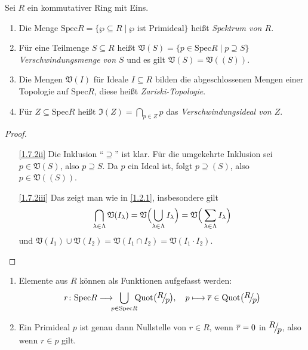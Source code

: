 \documentclass[a4paper,12pt]{scrbook}
\newtheorem{proof}{Beweis}
\def\V{\mathfrak{V}}
\def\I{\mathfrak{I}}
\newcommand{\Spec}{\mathrm{Spec}}
\newcommand{\ra}{\longrightarrow}
\newcommand{\Quot}{\mathrm{Quot}}
\renewcommand{\mapsto}{\longmapsto}
\def\Bar#1{\ensuremath\overline{#1}}
\newcommand{\Quotient}[2]{
  \raisebox{0.7ex}{\ensuremath{#1}}
  \ensuremath{\mkern-3mu}\big/\ensuremath{\mkern-3mu}
  \raisebox{-0.6ex}{\ensuremath{#2}}}
\begin{document}
\begin{db}\label{1.7.2}
  Sei $R$ ein kommutativer Ring mit Eins.
  \begin{enumerate}
  \item{} Die Menge $\Spec R = \{\wp\subseteq R \mid \wp\text{ ist Primideal}\}$ heißt \emph{Spektrum von $R$}.
  \item{} Für eine Teilmenge $S\subseteq R$ heißt $\V(S) = \{p\in\Spec R \mid p\supseteq S\}$
    \emph{Verschwindungsmenge von $S$} und es gilt $\V(S)=\V((S))$.
  \item{} Die Mengen $\V(I)$ für Ideale $I\subseteq R$ bilden die abgeschlossenen Mengen einer Topologie auf
    $\Spec R$, diese heißt \emph{Zariski-Topologie}.
  \item{} Für $Z\subseteq\Spec R$ heißt $\I(Z)=\displaystyle\bigcap_{p\in Z}p$ das \emph{Verschwindungsideal von
      $Z$}.
  \end{enumerate}
\end{db}
\begin{proof}
  \begin{enumerate}
  \item[\ref{1.7.2ii}] Die Inklusion \enquote{$\supseteq$} ist klar. Für die umgekehrte Inklusion sei $p\in\V(S)$, also
    $p\supseteq S$. Da $p$ ein Ideal ist, folgt $p\supseteq (S)$, also $p\in\V((S))$.
  \item[\ref{1.7.2iii}] Das zeigt man wie in \cref{1.2.1}, insbesondere gilt
    \[\displaystyle\bigcap_{\lambda\in\Lambda}\V(I_\lambda) =
    \V\Bigl(\bigcup_{\lambda\in\Lambda}I_\lambda\Bigr)=\V\Bigr(\sum_{\lambda\in\Lambda}I_\lambda\Bigr)\] und
    $\V(I_1)\cup\V(I_2)=\V(I_1\cap I_2)=\V(I_1\cdot I_2)$.
  \end{enumerate}
\end{proof}

\begin{db}\label{1.7.3}
  \begin{enumerate}
  \item{} Elemente aus $R$ können als Funktionen aufgefasst werden:
    \[ r\colon \Spec R \ra \!\!\!\bigcup_{p\in\Spec R}\!\!\! \Quot\bigl(\Quotient{R}{p}\bigr),\quad
    p\mapsto\Bar{r}\in\Quot\bigl(\Quotient{R}{p}\bigr) \]
  \item{} Ein Primideal $p$ ist genau dann Nullstelle von $r\in R$, wenn $\Bar{r}=0$ in $\Quotient{R}{p}$, also wenn
    $r\in p$ gilt.
  \end{enumerate}
\end{db}
\end{document}
